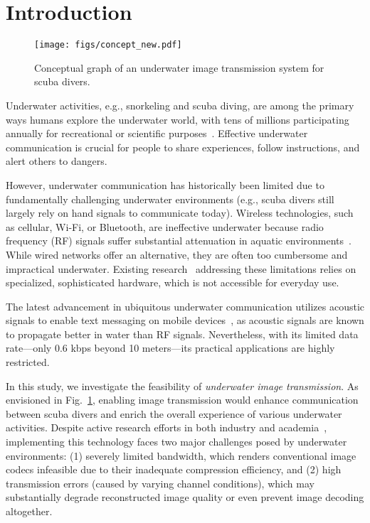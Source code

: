 \section{Introduction}\label{sec:introduction}

\begin{figure}[t]
\centering
\texttt{[image: figs/concept\_new.pdf]}
\caption{Conceptual graph of an underwater image transmission system for scuba divers.}
\label{fig:conceptual_graph}
\end{figure}

Underwater activities, e.g., snorkeling and scuba diving,
are among the primary ways humans explore the underwater world,
with tens of millions participating annually for recreational or scientific
purposes~\cite{stat_zhao_plus,stat_zhao,stat_zhao_1}.
Effective underwater communication is crucial for people to share experiences,
follow instructions, and alert others to dangers.

However, underwater communication has historically been limited due to
fundamentally challenging underwater environments
(e.g., scuba divers still largely rely on hand signals to communicate today).
Wireless technologies, such as cellular, Wi-Fi, or Bluetooth,
are ineffective underwater because radio frequency (RF) signals
suffer substantial attenuation in aquatic
environments~\cite{chen2022underwater,chen2023underwater}.
While wired networks offer an alternative, they are often too cumbersome and
impractical underwater.
Existing research~\cite{afzal2022battery,tonolini2018networking,jang2019underwater,carver2021amphilight,mobicom24_seascan} addressing these limitations
relies on specialized, sophisticated hardware, which is not accessible for
everyday use.

The latest advancement in ubiquitous underwater communication
utilizes acoustic signals to enable text messaging on mobile
devices~\cite{chen2022underwater}, as acoustic signals are known to propagate
better in water than RF signals. Nevertheless, with its limited data rate---only 0.6 kbps beyond 10 meters---its practical applications are highly restricted.

In this study, we investigate the feasibility of \emph{underwater
image transmission}. As envisioned in Fig.~\ref{fig:conceptual_graph},
enabling image transmission would enhance communication
between scuba divers and enrich the overall experience of various
underwater activities.
Despite active research efforts in both industry and
academia~\cite{gofish, AppleRD2021, liu2023efficient,afzal2022battery},
implementing this technology faces two major challenges
posed by underwater environments: (1) severely limited bandwidth, which renders
conventional image codecs infeasible due to their inadequate compression
efficiency, and (2) high transmission errors (caused by varying channel
conditions), which may substantially degrade
reconstructed image quality or even prevent image decoding altogether.

